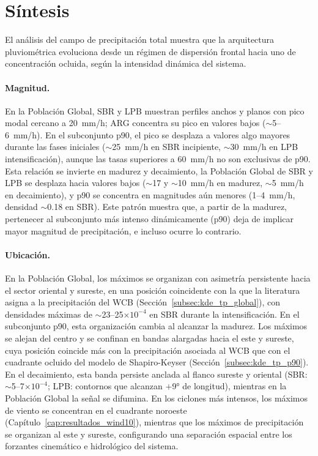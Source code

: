 \section{Síntesis}\label{sec:sintesis_tp}

El análisis del campo de precipitación total muestra que la arquitectura pluviométrica evoluciona desde un régimen de dispersión frontal hacia uno de concentración ocluida, según la intensidad dinámica del sistema.

\paragraph{Magnitud.}
En la Población Global, SBR y LPB muestran perfiles anchos y planos con pico modal cercano a 20~mm/h; ARG concentra su pico en valores bajos (${\sim}$5--6~mm/h). En el subconjunto p90, el pico se desplaza a valores algo mayores durante las fases iniciales (${\sim}$25~mm/h en SBR incipiente, ${\sim}$30~mm/h en LPB intensificación), aunque las tasas superiores a 60~mm/h no son exclusivas de p90. Esta relación se invierte en madurez y decaimiento, la Población Global de SBR y LPB se desplaza hacia valores bajos (${\sim}$17 y ${\sim}$10~mm/h en madurez, ${\sim}$5~mm/h en decaimiento), y p90 se concentra en magnitudes aún menores (1--4~mm/h, densidad ${\sim}$0.18 en SBR). Este patrón muestra que, a partir de la madurez, pertenecer al subconjunto más intenso dinámicamente (p90) deja de implicar mayor magnitud de precipitación, e incluso ocurre lo contrario.

\paragraph{Ubicación.}
En la Población Global, los máximos se organizan con asimetría persistente hacia el sector oriental y sureste, en una posición coincidente con la que la literatura asigna a la precipitación del WCB (Sección~\ref{subsec:kde_tp_global}), con densidades máximas de ${\sim}$23--25$\times10^{-4}$ en SBR durante la intensificación. En el subconjunto p90, esta organización cambia al alcanzar la madurez. Los máximos se alejan del centro y se confinan en bandas alargadas hacia el este y sureste, cuya posición coincide más con la precipitación asociada al WCB que con el cuadrante ocluido del modelo de Shapiro-Keyser (Sección~\ref{subsec:kde_tp_p90}). En el decaimiento, esta banda persiste anclada al flanco sureste y oriental (SBR: ${\sim}$5--7$\times10^{-4}$; LPB: contornos que alcanzan $+$9° de longitud), mientras en la Población Global la señal se difumina. En los ciclones más intensos, los máximos de viento se concentran en el cuadrante noroeste (Capítulo~\ref{cap:resultados_wind10}), mientras que los máximos de precipitación se organizan al este y sureste, configurando una separación espacial entre los forzantes cinemático e hidrológico del sistema.

